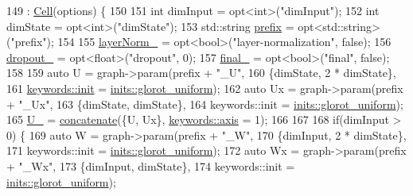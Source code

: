 \begin{DoxyCode}
149       : \hyperlink{classmarian_1_1rnn_1_1Cell_acc392c8adfb002c17993f02e6d3085a6}{Cell}(options) \{
150 
151     \textcolor{keywordtype}{int} dimInput = opt<int>(\textcolor{stringliteral}{"dimInput"});
152     \textcolor{keywordtype}{int} dimState = opt<int>(\textcolor{stringliteral}{"dimState"});
153     std::string \hyperlink{namespacemarian_1_1keywords_aa2cadd13ac94307ff92c68efb57264ac}{prefix} = opt<std::string>(\textcolor{stringliteral}{"prefix"});
154 
155     \hyperlink{classmarian_1_1rnn_1_1GRU_af4559f4e35983ef5c4b228ca251f544c}{layerNorm\_} = opt<bool>(\textcolor{stringliteral}{"layer-normalization"}, \textcolor{keyword}{false});
156     \hyperlink{classmarian_1_1rnn_1_1GRU_ad5dec297676453431349eb1509a215cf}{dropout\_} = opt<float>(\textcolor{stringliteral}{"dropout"}, 0);
157     \hyperlink{classmarian_1_1rnn_1_1GRU_ac67ae752da2dac75c13d462dffff70ba}{final\_} = opt<bool>(\textcolor{stringliteral}{"final"}, \textcolor{keyword}{false});
158 
159     \textcolor{keyword}{auto} U = graph->param(prefix + \textcolor{stringliteral}{"\_U"},
160                           \{dimState, 2 * dimState\},
161                           \hyperlink{namespacemarian_1_1keywords_afdd3807e3d6fe2bc979d11fa0cf3ee3e}{keywords::init} = \hyperlink{namespacemarian_1_1inits_a8838c47537f434b855491cd3ed97ccd1}{inits::glorot\_uniform});
162     \textcolor{keyword}{auto} Ux = graph->param(prefix + \textcolor{stringliteral}{"\_Ux"},
163                            \{dimState, dimState\},
164                            keywords::init = \hyperlink{namespacemarian_1_1inits_a8838c47537f434b855491cd3ed97ccd1}{inits::glorot\_uniform});
165     \hyperlink{classmarian_1_1rnn_1_1GRU_a3e2ad5f403491468b529e60a95be47d2}{U\_} = \hyperlink{namespacemarian_a2791a2c8f79a938f5cb22ae613680675}{concatenate}(\{U, Ux\}, \hyperlink{namespacemarian_1_1keywords_ace9158eabbddaca833133f12da98b9d6}{keywords::axis} = 1);
166 
167 
168     \textcolor{keywordflow}{if}(dimInput > 0) \{
169       \textcolor{keyword}{auto} W = graph->param(prefix + \textcolor{stringliteral}{"\_W"},
170                             \{dimInput, 2 * dimState\},
171                             keywords::init = \hyperlink{namespacemarian_1_1inits_a8838c47537f434b855491cd3ed97ccd1}{inits::glorot\_uniform});
172       \textcolor{keyword}{auto} Wx = graph->param(prefix + \textcolor{stringliteral}{"\_Wx"},
173                              \{dimInput, dimState\},
174                              keywords::init = \hyperlink{namespacemarian_1_1inits_a8838c47537f434b855491cd3ed97ccd1}{inits::glorot\_uniform});

\end{DoxyCode}
